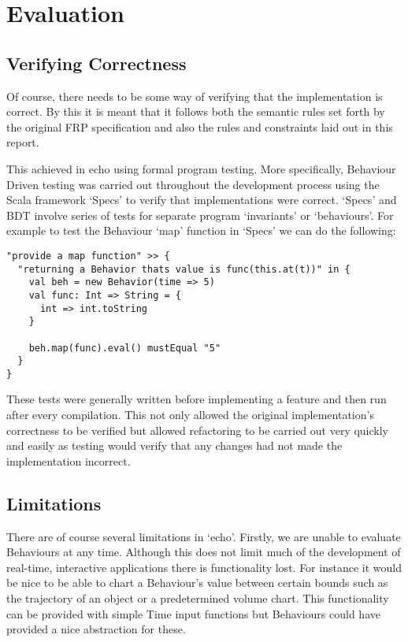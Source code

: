 \chapter{Evaluation}
  
  \section{Verifying Correctness}
    Of course, there needs to be some way of verifying that the implementation is correct. By
    this it is meant that it follows both the semantic rules set forth by the original FRP specification
    and also the rules and constraints laid out in this report.
  
    This achieved in echo using formal program testing. More specifically, Behaviour Driven
    testing was carried out throughout the development process using the Scala framework `Specs'
    to verify that implementations were correct. `Specs' and BDT involve series of tests for
    separate program `invariants' or `behaviours'. For example to test the Behaviour `map' function
    in `Specs' we can do the following:

\begin{verbatim}
"provide a map function" >> {
  "returning a Behavior thats value is func(this.at(t))" in {
    val beh = new Behavior(time => 5)
    val func: Int => String = {
      int => int.toString
    }

    beh.map(func).eval() mustEqual "5"
  }
}
\end{verbatim}      

    These tests were generally written before implementing a feature and then run after every compilation. 
    This not only allowed the original implementation's correctness to be verified but
    allowed refactoring to be carried out very quickly and easily as testing would verify that any changes had not
    made the implementation incorrect.
    
  \section{Limitations}
    There are of course several limitations in `echo'. Firstly, we are unable to evaluate Behaviours at any time.
    Although this does not limit much of the development of real-time, interactive applications there is functionality
    lost. For instance it would be nice to be able to chart a Behaviour's value between certain bounds such as
    the trajectory of an object or a predetermined volume chart. This functionality can be provided with simple
    Time input functions but Behaviours could have provided a nice abstraction for these.
    
